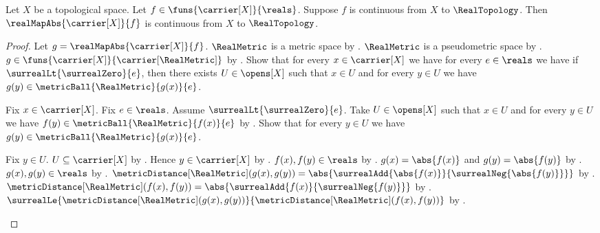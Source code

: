 \begin{theorem}\label{real_map_abs_continuous}
    Let $X$ be a topological space.
    Let $f\in\funs{\carrier[X]}{\reals}$.
    Suppose $f$ is continuous from $X$ to $\RealTopology$.
    Then $\realMapAbs{\carrier[X]}{f}$ is continuous from $X$ to
        $\RealTopology$.
\end{theorem}
\begin{proof}
    Let $g=\realMapAbs{\carrier[X]}{f}$.
    $\RealMetric$ is a metric space by .
    $\RealMetric$ is a pseudometric space by
        .
    $g\in\funs{\carrier[X]}{\carrier[\RealMetric]}$
        by
        .
    Show that for every $x\in\carrier[X]$ we have
        for every $e\in\reals$ we have if
            $\surrealLt{\surrealZero}{e}$, then there exists
            $U\in\opens[X]$ such that $x\in U$ and
            for every $y\in U$ we have
                $g(y)\in\metricBall{\RealMetric}{g(x)}{e}$.
    \begin{subproof}
        Fix $x\in\carrier[X]$.
        Fix $e\in\reals$.
        Assume $\surrealLt{\surrealZero}{e}$.
        Take $U\in\opens[X]$ such that $x\in U$ and
            for every $y\in U$ we have
                $f(y)\in\metricBall{\RealMetric}{f(x)}{e}$
            by
            .
        Show that for every $y\in U$ we have
            $g(y)\in\metricBall{\RealMetric}{g(x)}{e}$.
        \begin{subproof}
            Fix $y\in U$.
            $U\subseteq\carrier[X]$ by .
            Hence $y\in\carrier[X]$ by .
            $f(x),f(y)\in\reals$ by .
            $g(x)=\abs{f(x)}$ and $g(y)=\abs{f(y)}$
                by .
            $g(x),g(y)\in\reals$
                by .
            $\metricDistance[\RealMetric](g(x),g(y))
                =\abs{\surrealAdd{\abs{f(x)}}
                    {\surrealNeg{\abs{f(y)}}}}$
                by .
            $\metricDistance[\RealMetric](f(x),f(y))
                =\abs{\surrealAdd{f(x)}{\surrealNeg{f(y)}}}$
                by .
            $\surrealLe{\metricDistance[\RealMetric](g(x),g(y))}
                {\metricDistance[\RealMetric](f(x),f(y))}$
                by
                .

\end{subproof}
\end{subproof}
\end{proof}
